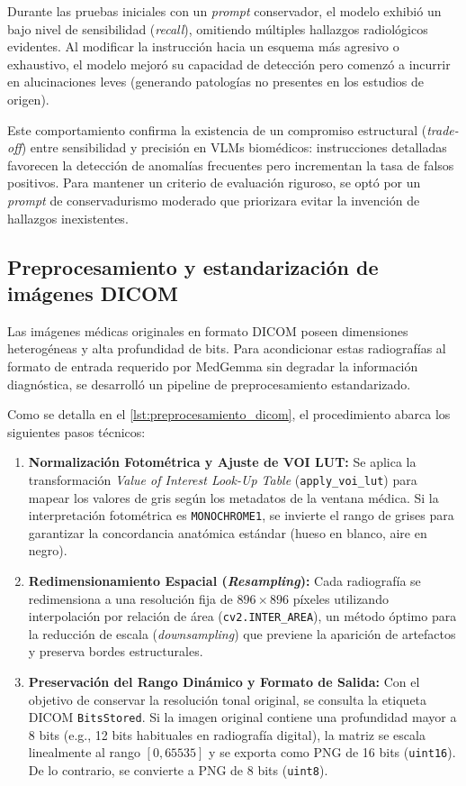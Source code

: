 \documentclass[../tesis.tex]{subfiles}
\begin{document}
Durante las pruebas iniciales con un \textit{prompt} conservador, el modelo exhibió un bajo nivel de sensibilidad (\textit{recall}), omitiendo múltiples hallazgos radiológicos evidentes. Al modificar la instrucción hacia un esquema más agresivo o exhaustivo, el modelo mejoró su capacidad de detección pero comenzó a incurrir en alucinaciones leves (generando patologías no presentes en los estudios de origen).

Este comportamiento confirma la existencia de un compromiso estructural (\textit{trade-off}) entre sensibilidad y precisión en VLMs biomédicos: instrucciones detalladas favorecen la detección de anomalías frecuentes pero incrementan la tasa de falsos positivos. Para mantener un criterio de evaluación riguroso, se optó por un \textit{prompt} de conservadurismo moderado que priorizara evitar la invención de hallazgos inexistentes.

\subsection{Preprocesamiento y estandarización de imágenes DICOM}

Las imágenes médicas originales en formato DICOM poseen dimensiones heterogéneas y alta profundidad de bits. Para acondicionar estas radiografías al formato de entrada requerido por MedGemma sin degradar la información diagnóstica, se desarrolló un pipeline de preprocesamiento estandarizado.

Como se detalla en el \autoref{lst:preprocesamiento_dicom}, el procedimiento abarca los siguientes pasos técnicos:

\begin{enumerate}
    \item \textbf{Normalización Fotométrica y Ajuste de VOI LUT:} Se aplica la transformación \textit{Value of Interest Look-Up Table} (\texttt{apply\_voi\_lut}) para mapear los valores de gris según los metadatos de la ventana médica. Si la interpretación fotométrica es \texttt{MONOCHROME1}, se invierte el rango de grises para garantizar la concordancia anatómica estándar (hueso en blanco, aire en negro).
    \item \textbf{Redimensionamiento Espacial (\textit{Resampling}):} Cada radiografía se redimensiona a una resolución fija de $896 \times 896$ píxeles utilizando interpolación por relación de área (\texttt{cv2.INTER\_AREA}), un método óptimo para la reducción de escala (\textit{downsampling}) que previene la aparición de artefactos y preserva bordes estructurales.
    \item \textbf{Preservación del Rango Dinámico y Formato de Salida:} Con el objetivo de conservar la resolución tonal original, se consulta la etiqueta DICOM \texttt{BitsStored}. Si la imagen original contiene una profundidad mayor a 8 bits (e.g., 12 bits habituales en radiografía digital), la matriz se escala linealmente al rango $[0, 65535]$ y se exporta como PNG de 16 bits (\texttt{uint16}). De lo contrario, se convierte a PNG de 8 bits (\texttt{uint8}).
\end{enumerate}
\end{document}

